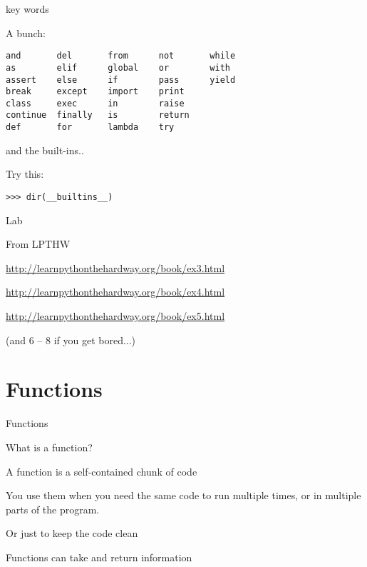 \documentclass{beamer}
\begin{document}
\begin{frame}[fragile]{key words}

{\Large  A bunch:}

\vspace{0.2in}
\begin{verbatim}
and       del       from      not       while    
as        elif      global    or        with     
assert    else      if        pass      yield    
break     except    import    print              
class     exec      in        raise              
continue  finally   is        return             
def       for       lambda    try
\end{verbatim}

\end{frame}

\begin{frame}[fragile]{and the built-ins..}

{\Large  Try this: 

\vspace{0.2in}
\verb+>>> dir(__builtins__)+

}
\end{frame}


\begin{frame}[fragile]{Lab}

{\large From LPTHW }

\vspace{0.2in}
\url{http://learnpythonthehardway.org/book/ex3.html}

\vspace{0.2in}
\url{http://learnpythonthehardway.org/book/ex4.html}

\vspace{0.2in}
\url{http://learnpythonthehardway.org/book/ex5.html}

(and 6 -- 8 if you get bored...)

\end{frame}

\section{Functions}

\begin{frame}[fragile]{Functions}

\vfill
{\Large What is a function?}

\vfill
{\large A function is a self-contained chunk of code}

\vfill
{\large You use them when you need the same code to run multiple times,
or in multiple parts of the program.}

\vfill
\hspace{1in}{\Large (DRY) }

\vfill
{\large Or just to keep the code clean}

\vfill
{\large Functions can take and return information}

\end{frame}
\end{document}

